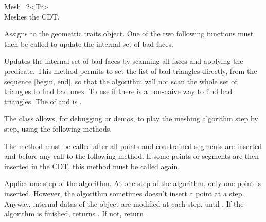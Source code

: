 \begin{ccRefClass}{Mesh_2<Tr>}
{ \\
  Meshes the CDT. }

{ Assigns  to the geometric traits object. One of the two
  following functions must then be called to update the internal set
  of bad faces.}

{ Updates the internal set of bad faces by scanning all faces and
  applying the  predicate. }
\ccGlue
{}
                   { This method permits to set the list of bad
                     triangles directly, from the sequence [begin,
                     end], so that the algorithm will not scan the
                     whole set of triangles to find bad ones. To use
                     if there is a non-naive way to find bad
                     triangles.
                     \ccPrecond The  of 
                     and  is .}

\begin{ccAdvanced}

The \ccRefName{} class allows, for debugging or demos, to play the
meshing algorithm step by step, using the following methods.

         { The method must be called after all points and constrained
           segments are inserted and before any call to the following
           method. If some points or segments are then inserted 
           in the CDT, this method must be called again. }

         { Applies one step of the algorithm. At one step of the algorithm,
           only one point is inserted. However, the algorithm
           sometimes doesn't insert a point at a step. Anyway,
           internal datas of the \ccRefName{} object are modified at
           each step, until . If the algorithm
           is finished, returns . If not, return
           .}

\end{ccAdvanced}

\end{ccRefClass}
